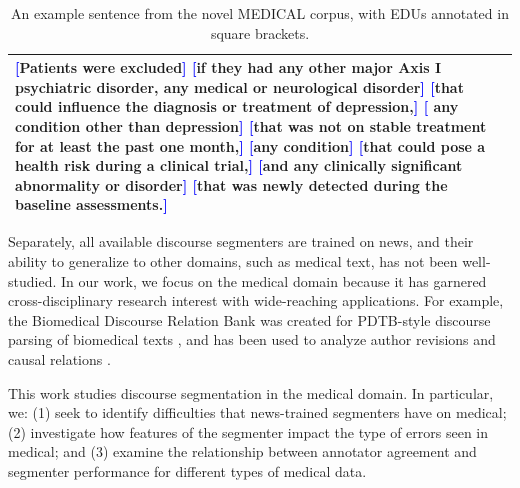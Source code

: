\begin{table}[t]
    \centering
    \begin{tabular}{p{7.3cm}}
    \toprule
    \textcolor{blue}{{\textbf{[}}}Patients were excluded{\textcolor{blue}{\textbf{]}}}
\textcolor{blue}{{\textbf{[}}}if they had any other major Axis I psychiatric disorder, any medical or neurological disorder{\textcolor{blue}{\textbf{]}}}
\textcolor{blue}{{\textbf{[}}}that could influence the diagnosis or treatment of depression,{\textcolor{blue}{\textbf{]}}}
\textcolor{blue}{{\textbf{[}}} any condition other than depression{\textcolor{blue}{\textbf{]}}}
\textcolor{blue}{{\textbf{[}}}that was not on stable treatment for at least the past one month,{\textcolor{blue}{\textbf{]}}}
\textcolor{blue}{{\textbf{[}}}any condition{\textcolor{blue}{\textbf{]}}}
\textcolor{blue}{{\textbf{[}}}that could pose a health risk during a clinical trial,{\textcolor{blue}{\textbf{]}}}
\textcolor{blue}{{\textbf{[}}}and any clinically significant abnormality or disorder{\textcolor{blue}{\textbf{]}}}
\textcolor{blue}{{\textbf{[}}}that was newly detected during the baseline assessments.{\textcolor{blue}{\textbf{]}}}  \\
    \bottomrule
    \end{tabular}
    \vspace{-0.6em}
    \caption{An example sentence from the novel \textsc{MEDICAL} corpus, with EDUs annotated in square brackets.}
    \label{tab:corpus_example}
\end{table}

Separately, all available discourse segmenters are trained on news, and their ability to generalize to other domains, such as medical text, has not been well-studied. In our work, we focus on the medical domain because it has garnered cross-disciplinary research interest with wide-reaching applications. For example, the Biomedical Discourse Relation Bank was created for PDTB-style discourse parsing of biomedical texts \cite{Prasad:2011}, and has been used to analyze author revisions and causal relations \cite{Zhang:2016,Marsi:2014}.


This work studies discourse segmentation in the medical domain. In particular, we: (1) seek to identify difficulties that news-trained segmenters have on medical; (2) investigate how features of the segmenter impact the type of errors seen in medical; and (3) examine the relationship between annotator agreement and segmenter performance for different types of medical data.

